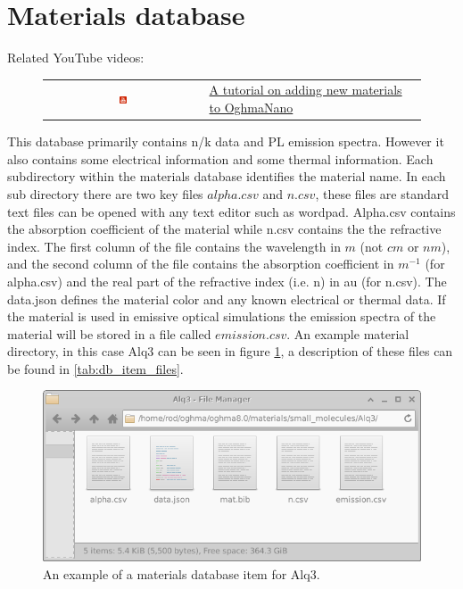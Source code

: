 \newpage
\section{Materials database}
\label{sec:materialdatabase}
Related YouTube videos:
\begin{figure}[H]

\begin{tabular}{ c l }

\includegraphics[width=0.05\textwidth]{./images/youtube.png}

&
\href{https://www.youtube.com/watch?v=0u6_jRVhZwU}{A tutorial on adding new materials to OghmaNano}

\end{tabular}
\end{figure}

This database primarily contains n/k data and PL emission spectra. However it also contains some electrical information and some thermal information. Each subdirectory within the materials database identifies the material name.  In each sub directory there are two key files $alpha.csv$ and $n.csv$, these files are standard text files can be opened with any text editor such as wordpad.  Alpha.csv contains the absorption coefficient of the material while n.csv contains the the refractive index.  The first column of the file contains the wavelength in $m$ (not $cm$ or $nm$), and the second column of the file contains the absorption coefficient in $m^{-1}$ (for alpha.csv) and the real part of the refractive index (i.e. n) in au (for n.csv). The data.json defines the material color and any known electrical or thermal data. If the material is used in emissive optical simulations the emission spectra of the material will be stored in a file called $emission.csv$. An example material directory, in this case Alq3 can be seen in figure \ref{fig:material_example}, a description of these files can be found in \ref{tab:db_item_files}.


\begin{figure}[H]
\centering
\includegraphics[height=0.18\textwidth]{./images/database_materials/db_item.png}
\caption{An example of a materials database item for Alq3.}
\label{fig:material_example}
\end{figure}

